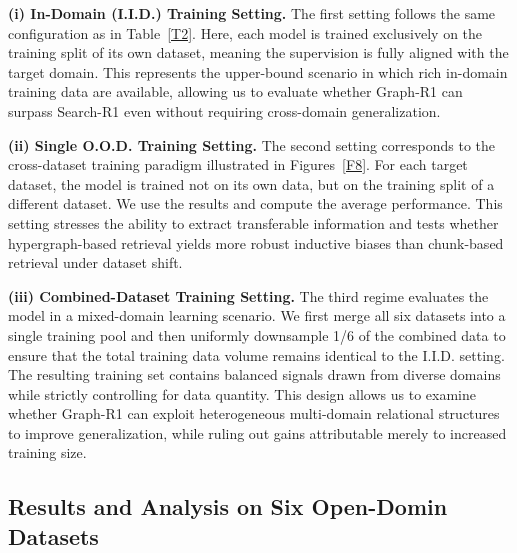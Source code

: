 \documentclass{article}
\theoremstyle{plain}
\theoremstyle{definition}
\theoremstyle{remark}
\begin{document}
\textbf{(i) In-Domain (I.I.D.) Training Setting. }
The first setting follows the same configuration as in Table~\ref{T2}.
Here, each model is trained exclusively on the training split of its own dataset, meaning the supervision is fully aligned with the target domain. This represents the upper-bound scenario in which rich in-domain training data are available, allowing us to evaluate whether Graph-R1 can surpass Search-R1 even without requiring cross-domain generalization.

\textbf{(ii) Single O.O.D. Training Setting. }
The second setting corresponds to the cross-dataset training paradigm illustrated in Figures~\ref{F8}.
For each target dataset, the model is trained not on its own data, but on the training split of a different dataset. We use the results and compute the average performance. This setting stresses the ability to extract transferable information and tests whether hypergraph-based retrieval yields more robust inductive biases than chunk-based retrieval under dataset shift.

\textbf{(iii) Combined-Dataset Training Setting. }
The third regime evaluates the model in a mixed-domain learning scenario.
We first merge all six datasets into a single training pool and then uniformly downsample 1/6 of the combined data to ensure that the total training data volume remains identical to the I.I.D. setting. The resulting training set contains balanced signals drawn from diverse domains while strictly controlling for data quantity. This design allows us to examine whether Graph-R1 can exploit heterogeneous multi-domain relational structures to improve generalization, while ruling out gains attributable merely to increased training size.

\subsection{Results and Analysis on Six Open-Domin Datasets}
\end{document}
